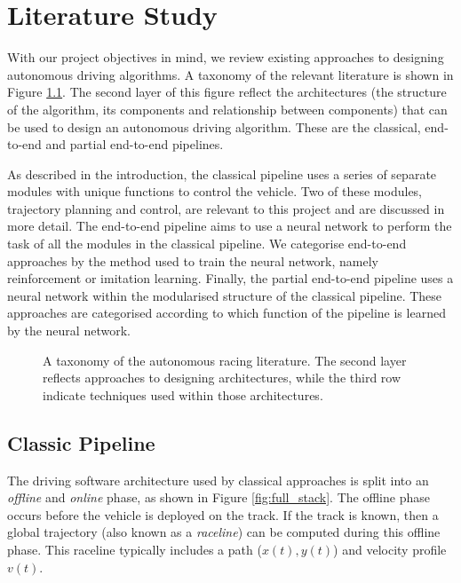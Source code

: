\chapter{Literature Study}
\label{chp:litreview}
With our project objectives in mind, we review existing approaches to designing autonomous driving algorithms.
A taxonomy of the relevant literature is shown in Figure \ref{fig:lit_tax_sec}. 
The second layer of this figure reflect the architectures (the structure of the algorithm, its components and relationship between components) that can be used to design an autonomous driving algorithm.
These are the classical, end-to-end and partial end-to-end pipelines.

As described in the introduction, the classical pipeline uses a series of separate modules with unique functions to control the vehicle.
Two of these modules, trajectory planning and control, are relevant to this project and are discussed in more detail.
The end-to-end pipeline aims to use a neural network to perform the task of all the modules in the classical pipeline.
We categorise end-to-end approaches by the method used to train the neural network, namely reinforcement or imitation learning.
Finally, the partial end-to-end pipeline uses a neural network within the modularised structure of the classical pipeline. 
These approaches are categorised according to which function of the pipeline is learned by the neural network. 

\begin{figure}[htb!]
    \centering
    
    \caption[A taxonomy of the autonomous racing literature with sections]{A taxonomy of the autonomous racing literature. The second layer reflects approaches to designing architectures, while the third row indicate techniques used within those architectures.}
    \label{fig:lit_tax_sec}
\end{figure}



\section{Classic Pipeline}
\label{sec:classic}

The driving software architecture used by classical approaches is split into an \emph{offline} and \emph{online} phase, as shown in Figure \ref{fig:full_stack}.
The offline phase occurs before the vehicle is deployed on the track.
If the track is known, then a global trajectory (also known as a \emph{raceline}) can be computed during this offline phase.
This raceline typically includes a path ($x(t), y(t)$) and velocity profile $v(t)$.

